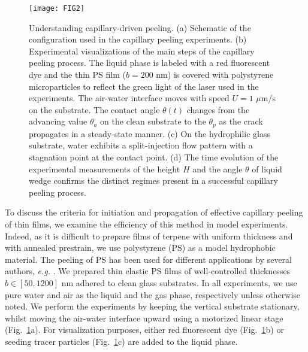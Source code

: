 \documentclass[10pt,twocolumn]{article}
\begin{document}
\begin{figure}[ht!]
    \texttt{[image: FIG2]}%
    \caption{Understanding capillary-driven peeling. (a) Schematic of the configuration used in the capillary peeling experiments. (b) Experimental visualizations of the main steps of the capillary peeling process.
    The liquid phase is labeled with a red fluorescent dye and the thin PS film ($b = 200$ nm) is covered with polystyrene microparticles to reflect the green light of the laser used in the experiments.
    The air-water interface moves with speed $U = 1$ $\mu$m/s on the substrate.
    The contact angle $\theta(t)$ changes from the advancing value $\theta_a$ on the clean substrate to the $\theta_p$ as the crack propagates in a steady-state manner.
    (c) On the hydrophilic glass substrate, water exhibits a split-injection flow pattern with a stagnation point at the contact point. (d) The time evolution of the experimental measurements of the height $H$ and the angle $\theta$ of liquid wedge confirms the distinct regimes present in a successful capillary peeling process.}
    \label{fig:intro_sch}
\end{figure}


To discuss the criteria for initiation and propagation of effective capillary peeling of thin films, we examine the efficiency of this method in model experiments.
Indeed, as it is difficult to prepare films of terpene with uniform thickness and with annealed prestrain, we use polystyrene (PS) as a model hydrophobic material.
The peeling of PS has been used for different applications by several authors, \textit{e.g.} \cite{Bodiguel:2006,Huang:2007, Baumchen:2012}.
We prepared thin elastic PS films of well-controlled thicknesses $b \in [50,1200]$ nm adhered to clean glass substrates.
In all experiments, we use pure water and air as the liquid and the gas phase, respectively unless otherwise noted.
We perform the experiments by keeping the vertical substrate stationary, whilst moving the air-water interface upward using a motorized linear stage (Fig.~\ref{fig:intro_sch}a).
For visualization purposes, either red fluorescent dye (Fig.~\ref{fig:intro_sch}b) or seeding tracer particles (Fig.~\ref{fig:intro_sch}c) are added to the liquid phase.

\end{document}
